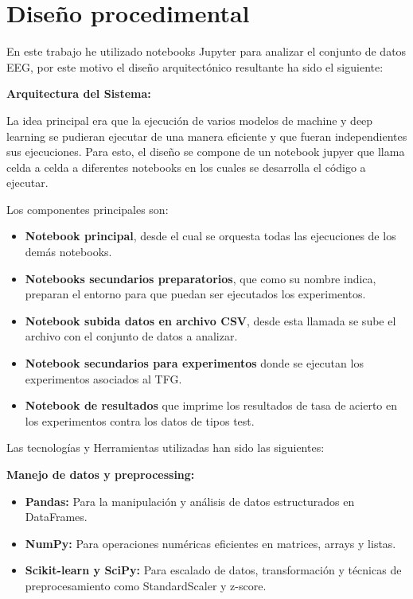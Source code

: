 \section{Diseño procedimental}

En este trabajo he utilizado notebooks Jupyter para analizar el conjunto de datos EEG, por este motivo el diseño arquitectónico resultante ha sido el siguiente:


\textbf{Arquitectura del Sistema:}

La idea principal era que la ejecución de varios modelos de machine y deep learning se pudieran ejecutar de una manera eficiente y que fueran independientes sus ejecuciones. 
Para esto, el diseño se compone de un notebook jupyer que llama celda a celda a diferentes notebooks en los cuales se desarrolla el código a ejecutar. 

Los componentes principales son:

  \begin{itemize}
  \tightlist
  \item
   \textbf{Notebook principal}, desde el cual se orquesta todas las ejecuciones de los demás notebooks.
  \item
   \textbf{Notebooks secundarios preparatorios}, que como su nombre indica, preparan el entorno para que puedan ser ejecutados los experimentos.
  \item
   \textbf{Notebook subida datos en archivo CSV}, desde esta llamada se sube el archivo con el conjunto de datos a analizar.
  \item
   \textbf{Notebook secundarios para experimentos} donde se ejecutan los experimentos asociados al TFG.
  \item
   \textbf{Notebook de resultados} que imprime los resultados de tasa de acierto en los experimentos contra los datos de tipos test.
  \end{itemize}
  

Las tecnologías y Herramientas utilizadas han sido las siguientes:

  \textbf{Manejo de datos y preprocessing:}

  \begin{itemize}
  \tightlist
  \item
   \textbf{Pandas:} Para la manipulación y análisis de datos estructurados en DataFrames.
  \item
   \textbf{NumPy:} Para operaciones numéricas eficientes en matrices, arrays y listas.
  \item
   \textbf{Scikit-learn y SciPy:} Para escalado de datos, transformación y técnicas de preprocesamiento como StandardScaler y z-score.
  \end{itemize}

